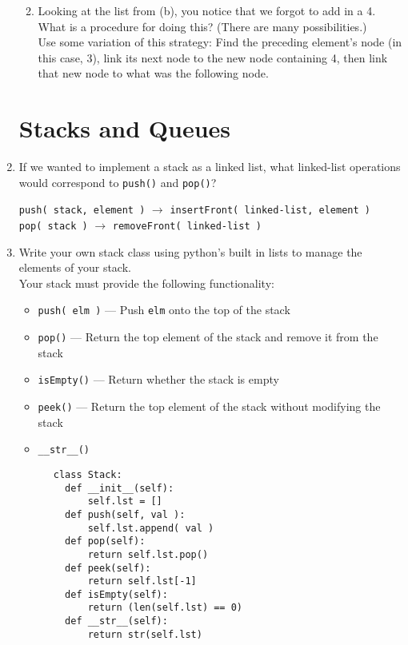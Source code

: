 \documentclass[11pt]{article}
\newenvironment{answer}{\large\lstset{basicstyle=\tiny\ttfamily}\color{white}}{}
\newenvironment{answer}{\large\lstset{basicstyle=\large\ttfamily}\color{red}}{}
\begin{document}
\begin{enumerate}
\begin{enumerate}
\begin{answer}
				\end{answer}
				\vspace{1in}
            \item Looking at the list from (b), you notice that we forgot to
                  add in a 4. What is a procedure for doing this? (There are
                  many possibilities.) \\
                \begin{answer}
				Use some variation of this strategy: Find the preceding element's node (in this case, 3), link its next node to the new node containing 4, then link that new node to what was the following node.
				\end{answer}
				\vspace{1in}
        \end{enumerate}


\pagebreak
\section*{Stacks and Queues}
\item If we wanted to implement a stack as a linked list, what linked-list
	operations would correspond to \texttt{push()} and \texttt{pop()}?

	\begin{answer}
	\texttt{push( stack, element )} $\rightarrow$ \texttt{insertFront( linked-list, element )} \\
	\texttt{pop( stack )} $\rightarrow$ \texttt{removeFront( linked-list )}
	\end{answer}

	
\item Write your own stack class using python's built in lists to manage the elements of your stack. \\
Your stack must provide the following functionality:
	  \begin{itemize}
	  \item []\texttt{push( elm )} --- Push \texttt{elm} onto the top of the stack
	  \item []\texttt{pop()} --- Return the top element of the stack and remove it from the stack
	  \item []\texttt{isEmpty()} --- Return whether the stack is empty
	  \item []\texttt{peek()} --- Return the top element of the stack without modifying the stack 
	  \item []\texttt{\_\_str\_\_()}
	  \end{itemize}
	  \begin{answer}
	  \begin{lstlisting}
	  class Stack:
		def __init__(self):
			self.lst = []
		def push(self, val ):
			self.lst.append( val )
		def pop(self):
			return self.lst.pop()
		def peek(self):
			return self.lst[-1]
		def isEmpty(self):
			return (len(self.lst) == 0)
		def __str__(self):
			return str(self.lst)
			  \end{lstlisting}
	  \end{answer}
	  \vspace{0.5in}


\end{enumerate}
\end{document}
